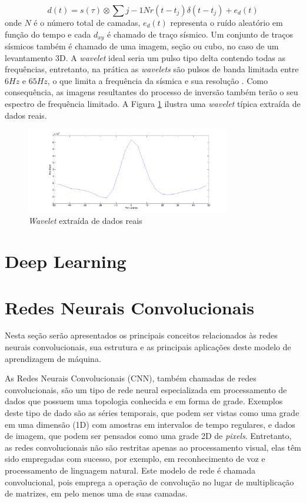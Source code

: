 \begin{equation}
d(t) = s(\tau) \otimes \sum{j-1}{N} r(t- t_j) \delta(t - t_j) + e_d(t)
\end{equation}
onde $N$ é o número
total de camadas, $e_d(t)$ representa o ruído aleatório em função do tempo
e cada $d_{xy}$ é chamado de traço sísmico. Um conjunto de traços
sísmicos também é chamado de uma imagem, seção ou cubo, no caso de um
levantamento 3D. A \textit{wavelet} ideal seria um pulso tipo delta contendo
todas as frequências, entretanto, na prática as
\textit{wavelets} são pulsos de banda limitada entre $6Hz$ e $65Hz$, o que
limita a frequência da sísmica e sua resolução \citep[p. 11]{sen_livro}.
Como consequência, as imagens resultantes do processo de inversão também terão
o seu espectro de frequência limitado.
A Figura \ref{fig:wavelet} ilustra uma \textit{wavelet} típica extraída de dados
reais.

\begin{figure}[htp]
\begin{center}
  \includegraphics[width=0.8\textwidth]{fig/wavelet}
  \caption{\textit{Wavelet} extraída de dados reais}
  \label{fig:wavelet}
\end{center}
\end{figure}

\section{Deep Learning}


\section{Redes Neurais Convolucionais}
Nesta seção serão apresentados os principais conceitos relacionados às redes
neurais convolucionais, sua estrutura e as principais
aplicações deste modelo de aprendizagem de máquina.

As Redes Neurais Convolucionais (CNN), também chamadas de redes convolucionais,
são um tipo de rede neural especializada em processamento de dados que possuem uma
topologia conhecida e em forma de grade. Exemplos deste tipo de dado são as séries
temporais, que podem ser vistas como uma grade em uma dimensão (1D) com amostras
em intervalos de tempo regulares, e dados de imagem, que podem ser pensados como
uma grade 2D de \textit{pixels}. Entretanto, as redes convolucionais não são restritas
apenas ao processamento visual, elas têm sido empregadas com sucesso, por exemplo,
em reconhecimento de voz e processamento de linguagem natural.
Este modelo de rede é chamada convolucional, pois emprega a operação de convolução
no lugar de multiplicação de matrizes, em pelo menos uma de suas camadas.

